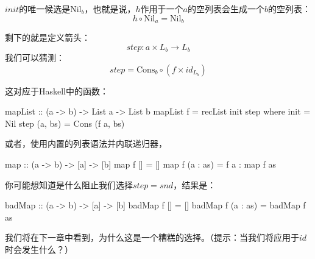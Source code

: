 \documentclass[DaoFP]{subfiles}
\begin{document}
    $\mathit{init}$的唯一候选是$\text{Nil}_b$，也就是说，$h$作用于一个$a$的空列表会生成一个$b$的空列表：
    \[ h \circ \text{Nil}_a = \text{Nil}_b \]

    剩下的就是定义箭头：
    \[\mathit{step} \colon a \times L_b \to L_b\]
    我们可以猜测：
    \[ \mathit{step} = \text{Cons}_b \circ (f \times id_{L_b}) \]

    这对应于Haskell中的函数：

    \begin{haskell}
        mapList :: (a -> b) -> List a -> List b
        mapList f = recList init step
        where
        init = Nil
        step (a, bs) = Cons (f a, bs)
    \end{haskell}
    或者，使用内置的列表语法并内联递归器，
    \begin{haskell}
        map :: (a -> b) -> [a] -> [b]
        map f [] = []
        map f (a : as) = f a : map f as
    \end{haskell}

    你可能想知道是什么阻止我们选择$\mathit{step} = \mathit{snd}$，结果是：
    \begin{haskell}
        badMap :: (a -> b) -> [a] -> [b]
        badMap f [] = []
        badMap f (a : as) = badMap f as
    \end{haskell}
    我们将在下一章中看到，为什么这是一个糟糕的选择。（提示：当我们将应用于$id$时会发生什么？）
\end{document}
